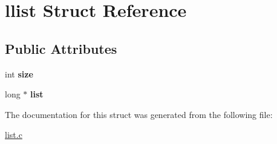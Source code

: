 \hypertarget{structllist}{}\section{llist Struct Reference}
\label{structllist}
\subsection*{Public Attributes}
\begin{DoxyCompactItemize}
\item 
\mbox{\label{structllist_a10e612886a406b85ba87caefa8dd7e4e}} 
int {\bfseries size}
\item 
\mbox{\label{structllist_a47b4d503f0df6354f20154b58ef0d7f1}} 
long $\ast$ {\bfseries list}
\end{DoxyCompactItemize}


The documentation for this struct was generated from the following file\+:\begin{DoxyCompactItemize}
\item 
\hyperlink{list_8c}{list.\+c}\end{DoxyCompactItemize}
